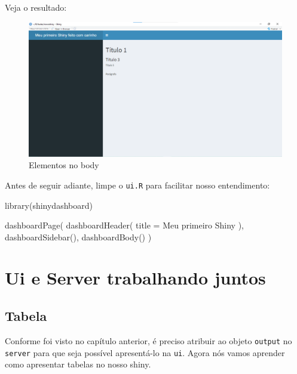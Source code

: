 \documentclass[
]{book}
\newenvironment{Shaded}{\begin{snugshade}}{\end{snugshade}}
\newcommand{\AttributeTok}[1]{\textcolor[rgb]{0.77,0.63,0.00}{#1}}
\newcommand{\FunctionTok}[1]{\textcolor[rgb]{0.00,0.00,0.00}{#1}}
\newcommand{\NormalTok}[1]{#1}
\newcommand{\StringTok}[1]{\textcolor[rgb]{0.31,0.60,0.02}{#1}}
\begin{document}
Veja o resultado:

\begin{figure}
\centering
\includegraphics{./imagens/cap10imagem10.png}
\caption{Elementos no body}
\end{figure}

Antes de seguir adiante, limpe o \texttt{ui.R} para facilitar nosso entendimento:

\begin{Shaded}
\begin{Highlighting}[]
\FunctionTok{library}\NormalTok{(shinydashboard)}

\FunctionTok{dashboardPage}\NormalTok{(}
  \FunctionTok{dashboardHeader}\NormalTok{(}
    \AttributeTok{title =} \StringTok{\textquotesingle{}Meu primeiro Shiny\textquotesingle{}}
\NormalTok{  ),}
  \FunctionTok{dashboardSidebar}\NormalTok{(),}
  \FunctionTok{dashboardBody}\NormalTok{()}
\NormalTok{)}
\end{Highlighting}
\end{Shaded}

\hypertarget{ui-e-server-trabalhando-juntos}{%
\section{Ui e Server trabalhando juntos}\label{ui-e-server-trabalhando-juntos}}

\hypertarget{tabela}{%
\subsection{Tabela}\label{tabela}}

Conforme foi visto no capítulo anterior, é preciso atribuir ao objeto \texttt{output} no \texttt{server} para que seja possível apresentá-lo na \texttt{ui}. Agora nós vamos aprender como apresentar tabelas no nosso shiny.
\end{document}
